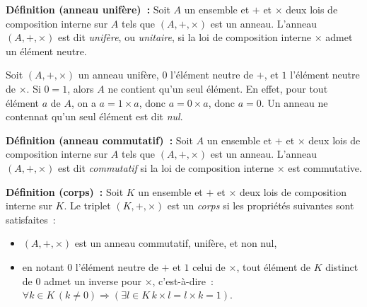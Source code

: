 \medskip

\noindent\textbf{Définition (anneau unifère) :} Soit $A$ un ensemble et $+$ et $\times$ deux lois de composition interne sur $A$ tels que $(A, +, \times)$ est un anneau. 
    L'anneau $(A, +, \times)$ est dit \textit{unifère}, ou \textit{unitaire}, si la loi de composition interne $\times$ admet un élément neutre.

\medskip

Soit $(A, +, \times)$ un anneau unifère, $0$ l'élément neutre de $+$, et $1$ l'élément neutre de $\times$. 
Si $0 = 1$, alors $A$ ne contient qu'un seul élément. 
En effet, pour tout élément $a$ de $A$, on a $a = 1 \times a$, donc $a = 0 \times a$, donc $a = 0$. 
Un anneau ne contennat qu'un seul élément est dit \textit{nul}. 

\medskip

\noindent\textbf{Définition (anneau commutatif) :} Soit $A$ un ensemble et $+$ et $\times$ deux lois de composition interne sur $A$ tels que $(A, +, \times)$ est un anneau. 
    L'anneau $(A, +, \times)$ est dit \textit{commutatif} si la loi de composition interne $\times$ est commutative.

\medskip

\noindent\textbf{Définition (corps) :} Soit $K$ un ensemble et $+$ et $\times$ deux lois de composition interne sur $K$. 
    Le triplet $(K, +, \times)$ est un \textit{corps} si les propriétés suivantes sont satisfaites : 
    \begin{itemize}[nosep]
        \item $(A,+,\times)$ est un anneau commutatif, unifère, et non nul,
        \item en notant $0$ l'élément neutre de $+$ et $1$ celui de $\times$, tout élément de $K$ distinct de $0$ admet un inverse pour $\times$, c'est-à-dire : $\forall k \in K \, (k \neq 0) \Rightarrow (\exists l \in K \, k \times l = l \times k = 1)$.
    \end{itemize}

\medskip

